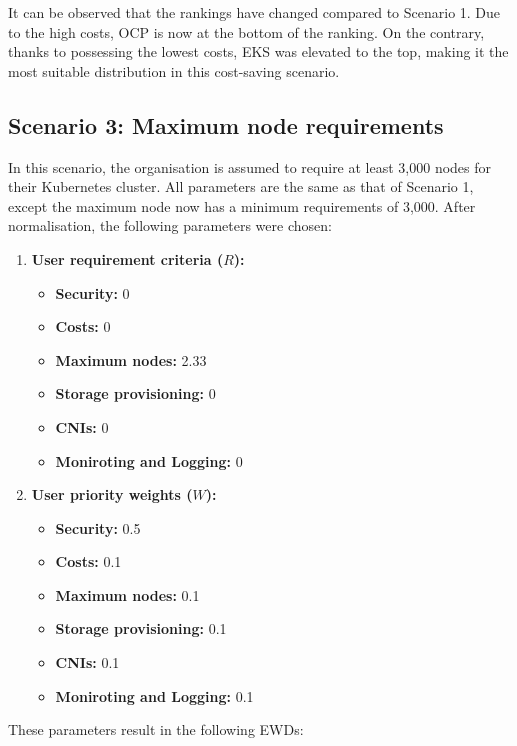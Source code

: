 It can be observed that the rankings have changed compared to Scenario 1. Due to the high costs, OCP is now at the bottom of the ranking. On the contrary, thanks to possessing the lowest costs, EKS was elevated to the top, making it the most suitable distribution in this cost-saving scenario.

\subsection{Scenario 3: Maximum node requirements}

In this scenario, the organisation is assumed to require at least 3,000 nodes for their Kubernetes cluster. All parameters are the same as that of Scenario 1, except the maximum node now has a minimum requirements of 3,000. After normalisation, the following parameters were chosen:

\begin{enumerate}
\def\labelenumi{\arabic{enumi}.}
\tightlist
\item
  \textbf{User requirement criteria (\(R\)):}
    \begin{itemize}
  \tightlist
  \item
    \textbf{Security:} 0
  \item
    \textbf{Costs:} 0
  \item
    \textbf{Maximum nodes:} 2.33
  \item
    \textbf{Storage provisioning:} 0
  \item
    \textbf{CNIs:} 0
  \item
    \textbf{Moniroting and Logging:} 0
  \end{itemize}
\item
  \textbf{User priority weights (\(W\)):}

  \begin{itemize}
  \tightlist
  \item
    \textbf{Security:} 0.5
  \item
    \textbf{Costs:} 0.1
  \item
    \textbf{Maximum nodes:} 0.1
  \item
    \textbf{Storage provisioning:} 0.1
  \item
    \textbf{CNIs:} 0.1
  \item
    \textbf{Moniroting and Logging:} 0.1
  \end{itemize}
\end{enumerate}

These parameters result in the following EWDs:


